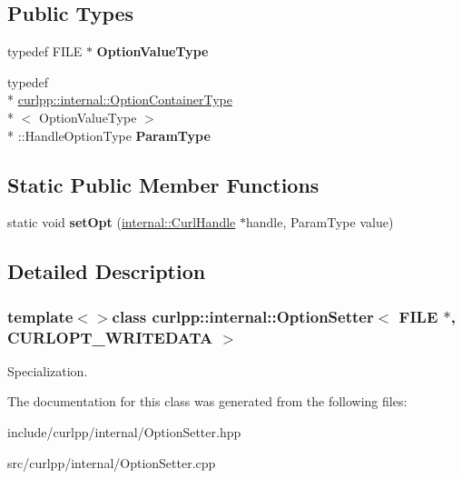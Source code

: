 \subsection*{Public Types}
\begin{DoxyCompactItemize}
\item 
\hypertarget{classcurlpp_1_1internal_1_1OptionSetter_3_01FILE_01_5_00_01CURLOPT__WRITEDATA_01_4_a47ff7300471eba06994db31b60186dc9}{typedef F\-I\-L\-E $\ast$ {\bfseries Option\-Value\-Type}}\label{classcurlpp_1_1internal_1_1OptionSetter_3_01FILE_01_5_00_01CURLOPT__WRITEDATA_01_4_a47ff7300471eba06994db31b60186dc9}

\item 
\hypertarget{classcurlpp_1_1internal_1_1OptionSetter_3_01FILE_01_5_00_01CURLOPT__WRITEDATA_01_4_a88258d8923c91ba05cc60224571a9626}{typedef \\*
\hyperlink{structcurlpp_1_1internal_1_1OptionContainerType}{curlpp\-::internal\-::\-Option\-Container\-Type}\\*
$<$ Option\-Value\-Type $>$\\*
\-::Handle\-Option\-Type {\bfseries Param\-Type}}\label{classcurlpp_1_1internal_1_1OptionSetter_3_01FILE_01_5_00_01CURLOPT__WRITEDATA_01_4_a88258d8923c91ba05cc60224571a9626}

\end{DoxyCompactItemize}
\subsection*{Static Public Member Functions}
\begin{DoxyCompactItemize}
\item 
\hypertarget{classcurlpp_1_1internal_1_1OptionSetter_3_01FILE_01_5_00_01CURLOPT__WRITEDATA_01_4_a61c5ee823a9d1bd6abb0c026f61fba4b}{static void {\bfseries set\-Opt} (\hyperlink{classcurlpp_1_1internal_1_1CurlHandle}{internal\-::\-Curl\-Handle} $\ast$handle, Param\-Type value)}\label{classcurlpp_1_1internal_1_1OptionSetter_3_01FILE_01_5_00_01CURLOPT__WRITEDATA_01_4_a61c5ee823a9d1bd6abb0c026f61fba4b}

\end{DoxyCompactItemize}


\subsection{Detailed Description}
\subsubsection*{template$<$$>$class curlpp\-::internal\-::\-Option\-Setter$<$ F\-I\-L\-E $\ast$, C\-U\-R\-L\-O\-P\-T\-\_\-\-W\-R\-I\-T\-E\-D\-A\-T\-A $>$}

Specialization. 

The documentation for this class was generated from the following files\-:\begin{DoxyCompactItemize}
\item 
include/curlpp/internal/Option\-Setter.\-hpp\item 
src/curlpp/internal/Option\-Setter.\-cpp\end{DoxyCompactItemize}
